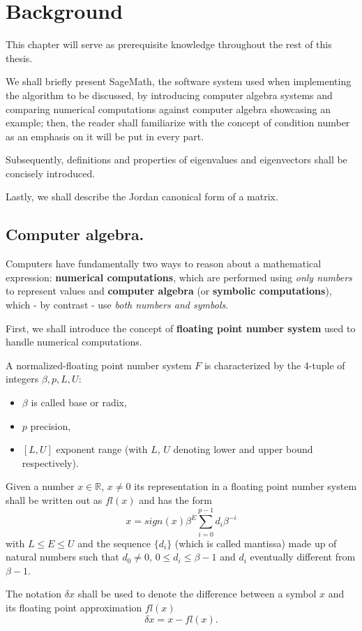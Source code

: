 \section{Background}
This chapter will serve as prerequisite knowledge throughout the rest of this thesis.

We shall briefly present SageMath, the software system used when implementing the algorithm to be discussed, by introducing
computer algebra systems and comparing numerical computations against computer algebra showcasing an example; then, the reader
shall familiarize with the concept of condition number as an emphasis on it will be put in every part.

Subsequently, definitions and properties of eigenvalues and eigenvectors shall be concisely introduced.

Lastly, we shall describe the Jordan canonical form of a matrix.

\subsection*{Computer algebra.}
Computers have fundamentally two ways to reason about a mathematical expression: \textbf{numerical computations}, which are
performed using \textit{only numbers} to represent values and \textbf{computer algebra} (or \textbf{symbolic computations}),
which - by contrast - use \textit{both numbers and symbols}.

First, we shall introduce the concept of \textbf{floating point number system} used to handle numerical computations.
\begin{definition}
    A normalized-floating point number system \(F\) is characterized by the 4-tuple of integers \(\beta, p, L, U\):
    \begin{itemize}[topsep=0pt, itemsep=0pt, parsep=0pt]
        \item \(\beta\) is called base or radix,
        \item \(p\) precision,
        \item \([L, U]\) exponent range (with \(L\), \(U\) denoting lower and upper bound respectively).
    \end{itemize}
    Given a number \(x \in \mathbb{R}\), \(x \neq 0\) its representation in a floating point number system shall be written out as
    \(fl(x)\) and has the form
    \[x = sign(x) \beta^E \sum_{i=0}^{p-1}d_{i}\beta^{-i}\]
    with \(L \leq E \leq U\) and the sequence \(\{d_{i}\}\) (which is called mantissa) made up of natural numbers such that
    \(d_{0} \neq 0\), \(0 \leq d_{i} \leq \beta - 1\) and \(d_{i}\) eventually different from \(\beta - 1\).

    The notation \(\delta x\) shall be used to denote the difference between a symbol \(x\) and its floating point
    approximation \(fl(x)\)
    \[
        \delta x = x - fl(x).
    \]
\end{definition}

